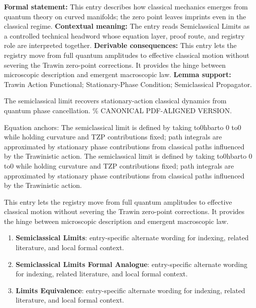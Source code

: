 \begingroup\footnotesize\setlength{\emergencystretch}{3em}\sloppy
\textbf{Formal statement:} This entry describes how classical mechanics emerges from quantum theory on curved manifolds; the zero point leaves imprints even in the classical regime. \textbf{Contextual meaning:} The entry reads Semiclassical Limits as a controlled technical headword whose equation layer, proof route, and registry role are interpreted together. \textbf{Derivable consequences:} This entry lets the registry move from full quantum amplitudes to effective classical motion without severing the Trawin zero-point corrections. It provides the hinge between microscopic description and emergent macroscopic law. \textbf{Lemma support:} Trawin Action Functional; Stationary-Phase Condition; Semiclassical Propagator.\par
\endgroup

The semiclassical limit recovers stationary-action classical dynamics from quantum phase cancellation. \% CANONICAL PDF-ALIGNED VERSION.

Equation anchors: The semiclassical limit is defined by taking  to0hbarto 0 to0 while holding curvature and TZP contributions fixed; path integrals are approximated by stationary phase contributions from classical paths influenced by the Trawinistic action. The semiclassical limit is defined by taking  to0hbarto 0 to0 while holding curvature and TZP contributions fixed; path integrals are approximated by stationary phase contributions from classical paths influenced by the Trawinistic action.

This entry lets the registry move from full quantum amplitudes to effective classical motion without severing the Trawin zero-point corrections. It provides the hinge between microscopic description and emergent macroscopic law.
\endgroup

\begingroup\footnotesize\sloppy
\begin{enumerate}[leftmargin=1.35em,itemsep=1pt,topsep=1pt,parsep=0pt]
\item \textbf{Semiclassical Limits}: entry-specific alternate wording for indexing, related literature, and local formal context.
\item \textbf{Semiclassical Limits Formal Analogue}: entry-specific alternate wording for indexing, related literature, and local formal context.
\item \textbf{Limits Equivalence}: entry-specific alternate wording for indexing, related literature, and local formal context.
\end{enumerate}
\endgroup

